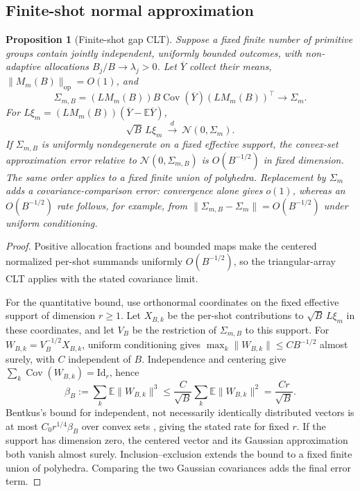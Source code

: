 \documentclass[a4paper,onecolumn,unpublished,nopdfoutputerror]{quantumarticle}
\theoremstyle{plain}
\newtheorem{proposition}[theorem]{Proposition}
\theoremstyle{definition}
\newcommand{\E}{\mathbb{E}}
\newcommand{\Cov}{\operatorname{Cov}}
\newcommand{\calN}{\mathcal{N}}
\newcommand{\1}{\mathbf{1}}
\newcommand{\op}{\mathrm{op}}
\begin{document}
\subsection{Finite-shot normal approximation}
\label{app:normal_approximation}

\begin{proposition}[Finite-shot gap CLT]
\label{prop:gap_clt}
Suppose a fixed finite number of primitive groups contain jointly independent, uniformly bounded outcomes, with non-adaptive allocations $B_j/B\to\lambda_j>0$. Let $\overline Y$ collect their means, $\|M_m(B)\|_{\op}=O(1)$, and
\[
\Sigma_{m,B}=(LM_m(B))B\Cov(\overline Y)(LM_m(B))^\top\longrightarrow\Sigma_m.
\]
For $L\xi_m=(LM_m(B))(\overline Y-\E\overline Y)$,
\begin{equation}
\sqrt B\,L\xi_m\ \overset{d}{\longrightarrow}\ \calN(0,\Sigma_m).
\end{equation}
If $\Sigma_{m,B}$ is uniformly nondegenerate on a fixed effective support, the convex-set approximation error relative to $\calN(0,\Sigma_{m,B})$ is $O(B^{-1/2})$ in fixed dimension. The same order applies to a fixed finite union of polyhedra. Replacement by $\Sigma_m$ adds a covariance-comparison error: convergence alone gives $o(1)$, whereas an $O(B^{-1/2})$ rate follows, for example, from $\|\Sigma_{m,B}-\Sigma_m\|=O(B^{-1/2})$ under uniform conditioning.
\end{proposition}

\begin{proof}
Positive allocation fractions and bounded maps make the centered normalized per-shot summands uniformly $O(B^{-1/2})$, so the triangular-array CLT applies with the stated covariance limit.

For the quantitative bound, use orthonormal coordinates on the fixed effective support of dimension $r\ge1$. Let $X_{B,k}$ be the per-shot contributions to $\sqrt B\,L\xi_m$ in these coordinates, and let $V_B$ be the restriction of $\Sigma_{m,B}$ to this support. For $W_{B,k}=V_B^{-1/2}X_{B,k}$, uniform conditioning gives $\max_k\|W_{B,k}\|\le C B^{-1/2}$ almost surely, with $C$ independent of $B$. Independence and centering give $\sum_k\Cov(W_{B,k})=\mathrm{Id}_r$, hence
\[
\beta_B:=\sum_k\E\|W_{B,k}\|^3
\le\frac{C}{\sqrt B}\sum_k\E\|W_{B,k}\|^2
=\frac{Cr}{\sqrt B}.
\]
Bentkus's bound for independent, not necessarily identically distributed vectors is at most $C_0r^{1/4}\beta_B$ over convex sets \cite{Bentkus2005}, giving the stated rate for fixed $r$. If the support has dimension zero, the centered vector and its Gaussian approximation both vanish almost surely. Inclusion--exclusion extends the bound to a fixed finite union of polyhedra. Comparing the two Gaussian covariances adds the final error term.
\end{proof}
\end{document}
